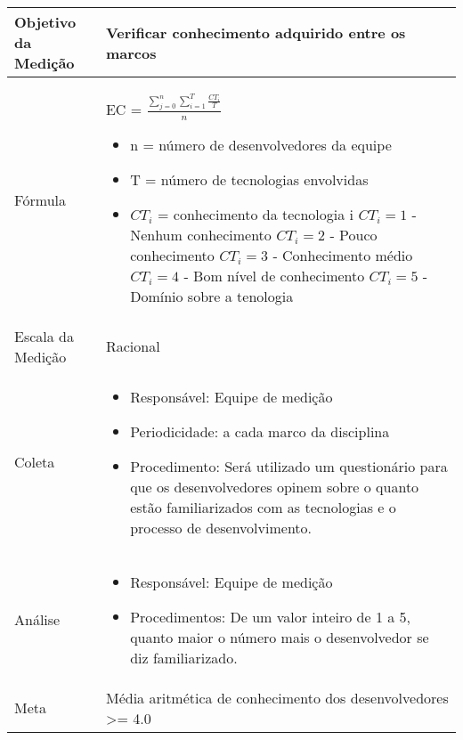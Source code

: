 	\begin{tabular}{ |p{4cm}|p{8cm}|  }
	 \hline
	 Objetivo da Medição 		& Verificar conhecimento adquirido entre os marcos	   \\
	 \hline
	 Fórmula		& 	EC = $ \frac{\sum_{j=0}^{n}\sum_{i=1}^{T}\frac{CT_i}{T}}{n} $	\begin{itemize}
		\item n = número de desenvolvedores da equipe
		\item T = número de tecnologias envolvidas
		\item $CT_i$ = conhecimento da tecnologia i
		\subitem $CT_i = 1$ - Nenhum conhecimento
		\subitem $CT_i = 2$ - Pouco conhecimento
		\subitem $CT_i = 3$ - Conhecimento médio
		\subitem $CT_i = 4$ - Bom nível de conhecimento
		\subitem $CT_i = 5$ - Domínio sobre a tenologia
	 \end{itemize}\\
	 \hline
	 Escala da Medição 		& 	Racional	 \\
	 \hline
	 Coleta		& 	\begin{itemize} \item Responsável: Equipe de medição \item Periodicidade: a cada marco da disciplina \item Procedimento: Será utilizado um questionário para que os desenvolvedores opinem sobre o quanto estão familiarizados com as tecnologias e o processo de desenvolvimento. \end{itemize}		\\
	 \hline
	 Análise		& 	\begin{itemize} \item Responsável: Equipe de medição \item Procedimentos: De um valor inteiro de 1 a 5, quanto maior o número mais o desenvolvedor se diz familiarizado. \end{itemize}	 \\
	 \hline
	 Meta		& 	Média aritmética de conhecimento dos desenvolvedores >= 4.0	 \\
	 \hline
	\end{tabular}



